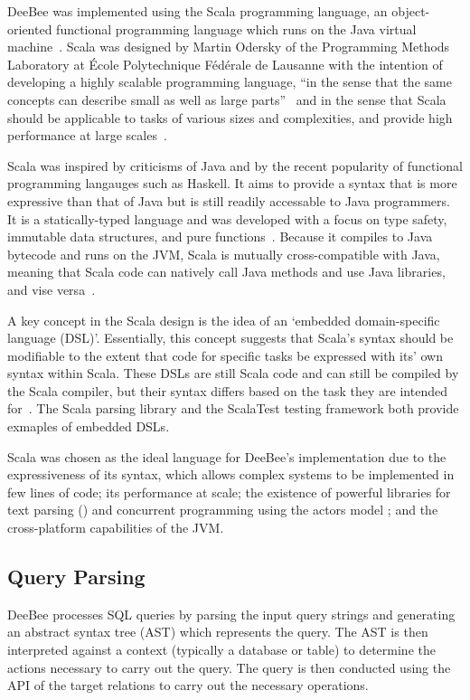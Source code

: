 DeeBee was implemented using the Scala programming language, an object-oriented functional programming language which runs on the Java virtual machine~\cite{odersky2004scala,odersky2004overview,odersky2008programming}. Scala was designed by Martin Odersky of the Programming Methods Laboratory at \'Ecole Polytechnique F\'ed\'erale de Lausanne with the intention of developing a highly scalable programming language, ``in the sense that the same concepts can describe small as well as large parts''~\cite{odersky2004scala} and in the sense that Scala should be applicable to tasks of various sizes and complexities, and provide high performance at large scales~\cite{odersky2008programming}. 

Scala was inspired by criticisms of Java and by the recent popularity of functional programming langauges such as Haskell. It aims to provide a syntax that is more expressive than that of Java but is still readily accessable to Java programmers. It is a statically-typed language and was developed with a focus on type safety, immutable data structures, and pure functions~\cite{odersky2004scala,odersky2004overview,odersky2008programming}. Because it compiles to Java bytecode and runs on the JVM, Scala is mutually cross-compatible with Java, meaning that Scala code can natively call Java methods and use Java libraries, and vise versa~\cite{odersky2008programming}.

A key concept in the Scala design is the idea of an `embedded domain-specific language (DSL)'. Essentially, this concept suggests that Scala's syntax should be modifiable to the extent that code for specific tasks be expressed with its' own syntax within Scala. These DSLs are still Scala code and can still be compiled by the Scala compiler, but their syntax differs based on the task they are intended for~\cite{ghosh2010dsls,hofer2008polymorphic,odersky2008programming}. The Scala parsing library and the ScalaTest testing framework both provide exmaples of embedded DSLs.

Scala was chosen as the ideal language for DeeBee's implementation due to the expressiveness of its syntax, which allows complex systems to be implemented in few lines of code; its performance at scale; the existence of powerful libraries for text parsing () and concurrent programming using the actors model ; and the cross-platform capabilities of the JVM.

\subsection{Query Parsing}
DeeBee processes SQL queries by parsing the input query strings and generating an abstract syntax tree (AST) which represents the query. The AST is then interpreted against a context (typically a database or table) to determine the actions necessary to carry out the query. The query is then conducted using the API of the target relations to carry out the necessary operations.

